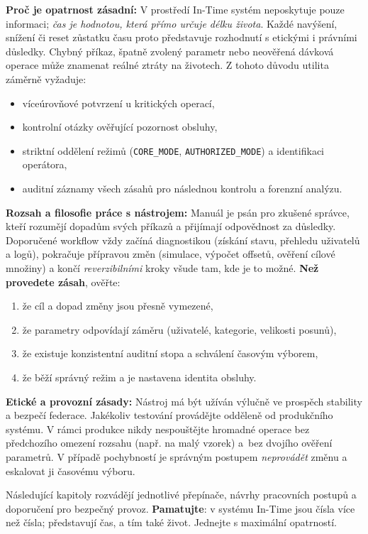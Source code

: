 \documentclass[11pt,a4paper]{book}
\begin{document}
\medskip
\noindent\textbf{Proč je opatrnost zásadní:} V prostředí In-Time systém neposkytuje pouze informaci; \emph{čas je hodnotou, která přímo určuje délku života}. Každé navýšení, snížení či reset zůstatku času proto představuje rozhodnutí s etickými i právními důsledky. Chybný příkaz, špatně zvolený parametr nebo neověřená dávková operace může znamenat reálné ztráty na životech. Z tohoto důvodu utilita záměrně vyžaduje:
\begin{itemize}
    \item víceúrovňové potvrzení u kritických operací,
    \item kontrolní otázky ověřující pozornost obsluhy,
    \item striktní oddělení režimů (\texttt{CORE\_MODE}, \texttt{AUTHORIZED\_MODE}) a identifikaci operátora,
    \item auditní záznamy všech zásahů pro následnou kontrolu a forenzní analýzu.
\end{itemize}

\medskip
\noindent\textbf{Rozsah a filosofie práce s nástrojem:} Manuál je psán pro zkušené správce, kteří rozumějí dopadům svých příkazů a přijímají odpovědnost za důsledky. Doporučené workflow vždy začíná diagnostikou (získání stavu, přehledu uživatelů a logů), pokračuje přípravou změn (simulace, výpočet offsetů, ověření cílové množiny) a končí \emph{reverzibilními} kroky všude tam, kde je to možné. \textbf{Než provedete zásah}, ověřte:
\begin{enumerate}
    \item že cíl a dopad změny jsou přesně vymezené,
    \item že parametry odpovídají záměru (uživatelé, kategorie, velikosti posunů),
    \item že existuje konzistentní auditní stopa a schválení časovým výborem,
    \item že běží správný režim a je nastavena identita obsluhy.
\end{enumerate}

\medskip
\noindent\textbf{Etické a provozní zásady:} Nástroj má být užíván výlučně ve prospěch stability a bezpečí federace. Jakékoliv testování provádějte odděleně od produkčního systému. V rámci produkce nikdy nespouštějte hromadné operace bez předchozího omezení rozsahu (např. na malý vzorek) a~bez dvojího ověření parametrů. V případě pochybností je správným postupem \emph{neprovádět} změnu a eskalovat ji časovému výboru.

\medskip
Následující kapitoly rozvádějí jednotlivé přepínače, návrhy pracovních postupů a doporučení pro bezpečný provoz. \textbf{Pamatujte}: v systému In-Time jsou čísla více než čísla; představují čas, a tím také život. Jednejte s maximální opatrností.
\end{document}
